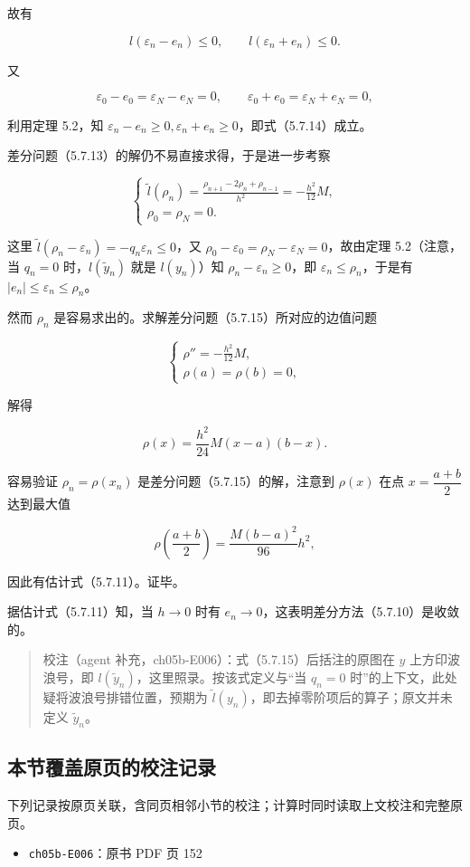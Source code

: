 \documentclass[
  10pt,
  fontset=fandol]{ctexart}
\providecommand{\tightlist}{%
  \setlength{\itemsep}{0pt}\setlength{\parskip}{0pt}}
\begin{document}
故有

\[
l(\varepsilon_n-e_n)\le0,\qquad l(\varepsilon_n+e_n)\le0.
\]

又

\[
\varepsilon_0-e_0=\varepsilon_N-e_N=0,\qquad\varepsilon_0+e_0=\varepsilon_N+e_N=0,
\]

利用定理 5.2，知 \(\varepsilon_n-e_n\ge0,\varepsilon_n+e_n\ge0\)，即式（5.7.14）成立。

差分问题（5.7.13）的解仍不易直接求得，于是进一步考察

\[
\begin{cases}
\displaystyle\tilde l(\rho_n)=\frac{\rho_{n+1}-2\rho_n+\rho_{n-1}}{h^2}=-\frac{h^2}{12}M,\\[6pt]
\rho_0=\rho_N=0.
\end{cases}
\tag{5.7.15}
\]

这里 \(\tilde l(\rho_n-\varepsilon_n)=-q_n\varepsilon_n\le0\)，又 \(\rho_0-\varepsilon_0=\rho_N-\varepsilon_N=0\)，故由定理 5.2（注意，当 \(q_n=0\) 时，\(l(\tilde y_n)\) 就是 \(l(y_n)\)）知 \(\rho_n-\varepsilon_n\ge0\)，即 \(\varepsilon_n\le\rho_n\)，于是有 \(|e_n|\le\varepsilon_n\le\rho_n\)。

然而 \(\rho_n\) 是容易求出的。求解差分问题（5.7.15）所对应的边值问题

\[
\begin{cases}
\displaystyle\rho''=-\frac{h^2}{12}M,\\[6pt]
\rho(a)=\rho(b)=0,
\end{cases}
\]

解得

\[
\rho(x)=\frac{h^2}{24}M(x-a)(b-x).
\]

容易验证 \(\rho_n=\rho(x_n)\) 是差分问题（5.7.15）的解，注意到 \(\rho(x)\) 在点 \(x=\dfrac{a+b}2\) 达到最大值

\[
\rho\left(\frac{a+b}2\right)=\frac{M(b-a)^2}{96}h^2,
\]

因此有估计式（5.7.11）。证毕。

据估计式（5.7.11）知，当 \(h\to0\) 时有 \(e_n\to0\)，这表明差分方法（5.7.10）是收敛的。

\begin{quote}
校注（agent 补充，ch05b-E006）：式（5.7.15）后括注的原图在 \(y\) 上方印波浪号，即 \(l(\tilde y_n)\)，这里照录。按该式定义与``当 \(q_n=0\) 时''的上下文，此处疑将波浪号排错位置，预期为 \(\tilde l(y_n)\)，即去掉零阶项后的算子；原文并未定义 \(\tilde y_n\)。
\end{quote}

\subsection{本节覆盖原页的校注记录}\label{ux672cux8282ux8986ux76d6ux539fux9875ux7684ux6821ux6ce8ux8bb0ux5f55}

下列记录按原页关联，含同页相邻小节的校注；计算时同时读取上文校注和完整原页。

\begin{itemize}
\tightlist
\item
  \texttt{ch05b-E006}：原书 PDF 页 152
\end{itemize}
\end{document}

